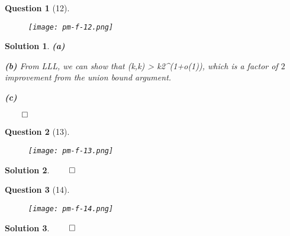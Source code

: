 \documentclass{article} %
\def\eQb#1\eQe{\begin{eqnarray*}#1\end{eqnarray*}}
\theoremstyle{quest}
\newtheorem*{question}{Question}
\newtheorem*{solution}{Solution}
\begin{document}
\newpage
\begin{question}[12]
\hfill
\begin{figure}[h!]
  \centering
    \texttt{[image: pm-f-12.png]}
\end{figure}
\end{question}
\begin{solution}
\textbf{(a)}

\bigskip

\textbf{(b)}
From LLL, we can show that
\eQb
R(k,k) > k2^{}(1+o(1)),
\eQe
which is a factor of $2$ improvement from the
union bound argument. 

\bigskip

\textbf{(c)}

\hfill $\qed$
\end{solution}
\newpage
\begin{question}[13]
\hfill
\begin{figure}[h!]
  \centering
    \texttt{[image: pm-f-13.png]}
\end{figure}
\end{question}
\begin{solution}
\hfill $\qed$
\end{solution}
\newpage
\begin{question}[14]
\hfill
\begin{figure}[h!]
  \centering
    \texttt{[image: pm-f-14.png]}
\end{figure}
\end{question}
\begin{solution}
\hfill $\qed$
\end{solution}
\newpage
\end{document}
